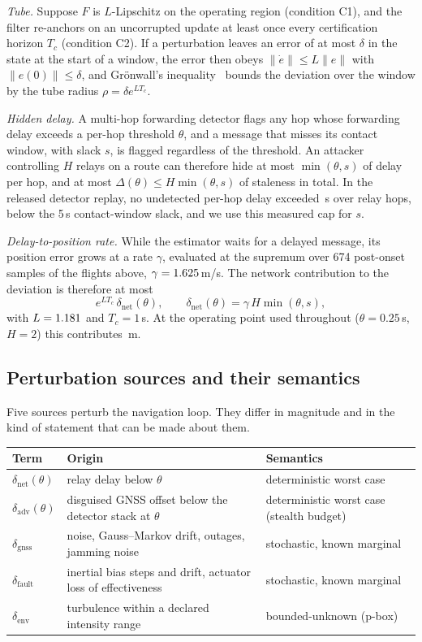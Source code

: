 \documentclass[letterpaper,twocolumn,10pt]{article}
\newcommand{\dnet}{\delta_{\mathrm{net}}}
\newcommand{\dfault}{\delta_{\mathrm{fault}}}
\newcommand{\denv}{\delta_{\mathrm{env}}}
\newcommand{\dgnss}{\delta_{\mathrm{gnss}}}
\newcommand{\dadv}{\delta_{\mathrm{adv}}}
\theoremstyle{remark}
\begin{document}
\emph{Tube.} Suppose $F$ is $L$-Lipschitz on the operating region (condition
C1), and the filter re-anchors on an uncorrupted update at least once every
certification horizon $T_c$ (condition C2). If a perturbation leaves an error of
at most $\delta$ in the state at the start of a window, the error then obeys
$\|\dot e\|\le L\|e\|$ with $\|e(0)\|\le\delta$, and Gr\"onwall's
inequality~\cite{gronwall1919} bounds the deviation over the window by the tube
radius $\rho=\delta e^{LT_c}$.

\emph{Hidden delay.} A multi-hop forwarding detector flags any hop whose
forwarding delay exceeds a per-hop threshold $\theta$, and a message that misses
its contact window, with slack $s$, is flagged regardless of the threshold. An
attacker controlling $H$ relays on a route can therefore hide at most
$\min(\theta,s)$ of delay per hop, and at most
$\Delta(\theta)\le H\min(\theta,s)$ of staleness in total. In the released detector replay, no
undetected per-hop delay exceeded \nParentSlack\,s over \nParentHops{} relay hops, below the
5\,s contact-window slack, and we use this measured cap for $s$.

\emph{Delay-to-position rate.} While the estimator waits for a delayed message,
its position error grows at a rate $\gamma$, evaluated at the supremum over 674
post-onset samples of the flights above, $\gamma=1.625$\,m/s. The
network contribution to the deviation is therefore at most
\begin{equation}
\label{eq:dnet}
e^{LT_c}\,\dnet(\theta),\qquad \dnet(\theta)=\gamma\,H\min(\theta,s),
\end{equation}
with $L=1.181$ and $T_c=1$\,s. At the operating point used throughout
($\theta=0.25$\,s, $H=2$) this contributes \nNetTubeQuarter\,m.

\subsection{Perturbation sources and their semantics}
Five sources perturb the navigation loop. They differ in magnitude and in the
kind of statement that can be made about them.

\begin{center}\small
\begin{tabularx}{\columnwidth}{@{}l>{\raggedright\arraybackslash}X>{\raggedright\arraybackslash}X@{}}
\toprule
\textbf{Term} & \textbf{Origin} & \textbf{Semantics} \\
\midrule
$\dnet(\theta)$ & relay delay below $\theta$ & deterministic worst case \\
$\dadv(\theta)$ & disguised GNSS offset below the detector stack at $\theta$ & deterministic worst case (stealth budget) \\
$\dgnss$ & noise, Gauss--Markov drift, outages, jamming noise & stochastic, known marginal \\
$\dfault$ & inertial bias steps and drift, actuator loss of effectiveness & stochastic, known marginal \\
$\denv$ & turbulence within a declared intensity range & bounded-unknown (p-box) \\
\bottomrule
\end{tabularx}
\end{center}
\end{document}
